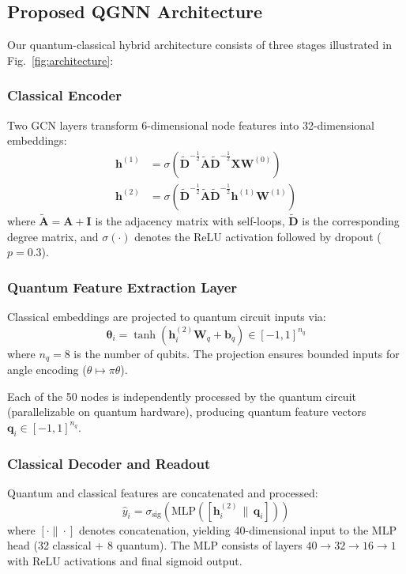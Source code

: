\documentclass[conference]{IEEEtran}
\begin{document}
\subsection{Proposed QGNN Architecture}

Our quantum-classical hybrid architecture consists of three stages illustrated in Fig.~\ref{fig:architecture}:

\subsubsection{Classical Encoder}
Two GCN layers transform 6-dimensional node features into 32-dimensional embeddings:
\begin{align}
\mathbf{h}^{(1)} &= \sigma\left(\tilde{\mathbf{D}}^{-\frac{1}{2}}\tilde{\mathbf{A}}\tilde{\mathbf{D}}^{-\frac{1}{2}} \mathbf{X} \mathbf{W}^{(0)}\right) \label{eq:gcn1}\\
\mathbf{h}^{(2)} &= \sigma\left(\tilde{\mathbf{D}}^{-\frac{1}{2}}\tilde{\mathbf{A}}\tilde{\mathbf{D}}^{-\frac{1}{2}} \mathbf{h}^{(1)} \mathbf{W}^{(1)}\right) \label{eq:gcn2}
\end{align}
where $\tilde{\mathbf{A}} = \mathbf{A} + \mathbf{I}$ is the adjacency matrix with self-loops, $\tilde{\mathbf{D}}$ is the corresponding degree matrix, and $\sigma(\cdot)$ denotes the ReLU activation followed by dropout ($p=0.3$).

\subsubsection{Quantum Feature Extraction Layer}
Classical embeddings are projected to quantum circuit inputs via:
\begin{equation}
\boldsymbol{\theta}_i = \tanh\left(\mathbf{h}^{(2)}_i \mathbf{W}_q + \mathbf{b}_q\right) \in [-1, 1]^{n_q}
\label{eq:projection}
\end{equation}
where $n_q = 8$ is the number of qubits. The projection ensures bounded inputs for angle encoding ($\theta \mapsto \pi\theta$).

Each of the 50 nodes is independently processed by the quantum circuit (parallelizable on quantum hardware), producing quantum feature vectors $\mathbf{q}_i \in [-1, 1]^{n_q}$.

\subsubsection{Classical Decoder and Readout}
Quantum and classical features are concatenated and processed:
\begin{equation}
\hat{y}_i = \sigma_{\text{sig}}\left(\text{MLP}\left([\mathbf{h}^{(2)}_i \,\|\, \mathbf{q}_i]\right)\right)
\label{eq:readout}
\end{equation}
where $[\cdot \| \cdot]$ denotes concatenation, yielding 40-dimensional input to the MLP head (32 classical + 8 quantum). The MLP consists of layers $40 \rightarrow 32 \rightarrow 16 \rightarrow 1$ with ReLU activations and final sigmoid output.
\end{document}
